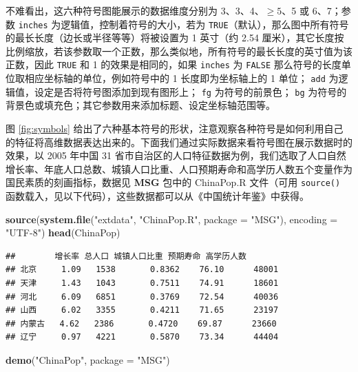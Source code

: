 \documentclass[
  b5paper,
  UTF8,twoside]{book}
\newenvironment{Shaded}{\begin{snugshade}}{\end{snugshade}}
\newcommand{\AttributeTok}[1]{\textcolor[rgb]{0.13,0.29,0.53}{#1}}
\newcommand{\FunctionTok}[1]{\textcolor[rgb]{0.13,0.29,0.53}{\textbf{#1}}}
\newcommand{\NormalTok}[1]{#1}
\newcommand{\StringTok}[1]{\textcolor[rgb]{0.31,0.60,0.02}{#1}}
\begin{document}
不难看出，这六种符号图能展示的数据维度分别为 3、3、4、\(\geq5\)、5 或 6、7；参数 \texttt{inches} 为逻辑值，控制着符号的大小，若为 \texttt{TRUE}（默认），那么图中所有符号的最长长度（边长或半径等等）将被设置为 1 英寸（约 2.54 厘米），其它长度按比例缩放，若该参数取一个正数，那么类似地，所有符号的最长长度的英寸值为该正数，因此 \texttt{TRUE} 和 1 的效果是相同的，如果 \texttt{inches} 为 \texttt{FALSE} 那么符号的长度单位取相应坐标轴的单位，例如符号中的 1 长度即为坐标轴上的 1 单位； \texttt{add} 为逻辑值，设定是否将符号图添加到现有图形上； \texttt{fg} 为符号的前景色； \texttt{bg} 为符号的背景色或填充色；其它参数用来添加标题、设定坐标轴范围等。

图 \ref{fig:symbols}
给出了六种基本符号的形状，注意观察各种符号是如何利用自己的特征将高维数据表达出来的。下面我们通过实际数据来看符号图在展示数据时的效果，以 2005 年中国 31 省市自治区的人口特征数据为例，我们选取了人口自然增长率、年底人口总数、城镇人口比重、人口预期寿命和高学历人数五个变量作为国民素质的刻画指标，数据见 \textbf{MSG} 包中的 ChinaPop.R 文件（可用 \texttt{source()} 函数载入，见以下代码），这些数据都可以从《中国统计年鉴》中获得。

\begin{Shaded}
\begin{Highlighting}[]
\FunctionTok{source}\NormalTok{(}\FunctionTok{system.file}\NormalTok{(}\StringTok{"extdata"}\NormalTok{, }\StringTok{"ChinaPop.R"}\NormalTok{, }\AttributeTok{package =} \StringTok{"MSG"}\NormalTok{), }\AttributeTok{encoding =} \StringTok{"UTF{-}8"}\NormalTok{)}
\FunctionTok{head}\NormalTok{(ChinaPop)}
\end{Highlighting}
\end{Shaded}

\begin{verbatim}
##        增长率 总人口 城镇人口比重 预期寿命 高学历人数
## 北京     1.09   1538       0.8362    76.10      48001
## 天津     1.43   1043       0.7511    74.91      18601
## 河北     6.09   6851       0.3769    72.54      40036
## 山西     6.02   3355       0.4211    71.65      23197
## 内蒙古   4.62   2386       0.4720    69.87      23660
## 辽宁     0.97   4221       0.5870    73.34      44404
\end{verbatim}





\begin{Shaded}
\begin{Highlighting}[]
\FunctionTok{demo}\NormalTok{(}\StringTok{"ChinaPop"}\NormalTok{, }\AttributeTok{package =} \StringTok{"MSG"}\NormalTok{)}
\end{Highlighting}
\end{Shaded}
\end{document}
